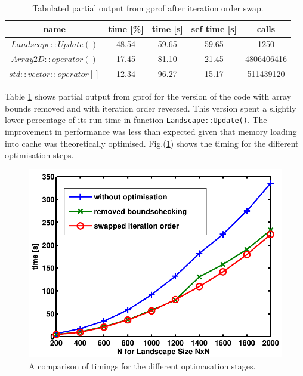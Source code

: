 \begin{table}[h!]
\caption{Tabulated partial output from gprof after iteration order swap.}
\label{tab: profile 3}
 \begin{center}
\begin{tabular}{|c|c|c|c|c|}
\hline
name & time [\%] & time [s] & sef time [s] & calls\\
\hline
$Landscape::Update()$ & 48.54 & 59.65 & 59.65 &1250 \\
\hline
$Array2D::operator()$& 17.45& 81.10& 21.45 &4806406416 \\
\hline
$std::vector::operator[]$& 12.34& 96.27 &15.17 &511439120\\
\hline
\end{tabular}
\end{center}
\end{table}

Table \ref{tab: profile 3} shows partial output from gprof for the version of the code with array bounds removed and with iteration order reversed.
This version spent a slightly lower percentage of its run time in function \texttt{Landscape::Update()}.
The improvement in performance was less than expected given that memory loading into cache was theoretically optimised. Fig.(\ref{fig:Optimisation}) shows the timing for the different optimisation steps.

\begin{figure}
\begin{center}
  \includegraphics[scale=0.7]{Figures/TimingsOptimisation.pdf}
\caption{A comparison of timings for the different optimasation stages.}
\label{fig:Optimisation}
\end{center}
\end{figure}


